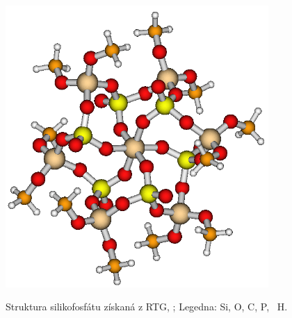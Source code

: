 \documentclass[
  digital, %
  table,   %
  lof,     %
  lot,     %
  oneside,
]{fithesis3}
\begin{document}
  \begin{figure}[h!]
  \caption{Struktura silikofosfátu získaná z RTG, \cite{C4TA06823H};  Legedna:  Si,  O,  C,  P, ~H. }
    \center
    \includegraphics[width=10cm]{struktura_puvodni.png}
    \label{rtg_koordinace_sest}
    \end{figure}
\end{document}
